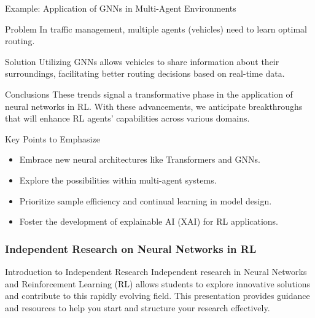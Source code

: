 \documentclass[aspectratio=169]{beamer}
\begin{document}
\begin{frame}[fragile]{Example: Application of GNNs in Multi-Agent Environments}
    \begin{block}{Problem}
    In traffic management, multiple agents (vehicles) need to learn optimal routing.
    \end{block}
    \begin{block}{Solution}
    Utilizing GNNs allows vehicles to share information about their surroundings, facilitating better routing decisions based on real-time data.
    \end{block}
\end{frame}

\begin{frame}[fragile]{Conclusions}
    These trends signal a transformative phase in the application of neural networks in RL. With these advancements, we anticipate breakthroughs that will enhance RL agents' capabilities across various domains.
\end{frame}

\begin{frame}[fragile]{Key Points to Emphasize}
    \begin{itemize}
        \item Embrace new neural architectures like Transformers and GNNs.
        \item Explore the possibilities within multi-agent systems.
        \item Prioritize sample efficiency and continual learning in model design.
        \item Foster the development of explainable AI (XAI) for RL applications.
    \end{itemize}
\end{frame}

\begin{frame}[fragile]
    \frametitle{Independent Research on Neural Networks in RL}
    \begin{block}{Introduction to Independent Research}
        Independent research in Neural Networks and Reinforcement Learning (RL) allows students to explore innovative solutions and contribute to this rapidly evolving field. This presentation provides guidance and resources to help you start and structure your research effectively.
    \end{block}
\end{frame}
\end{document}
